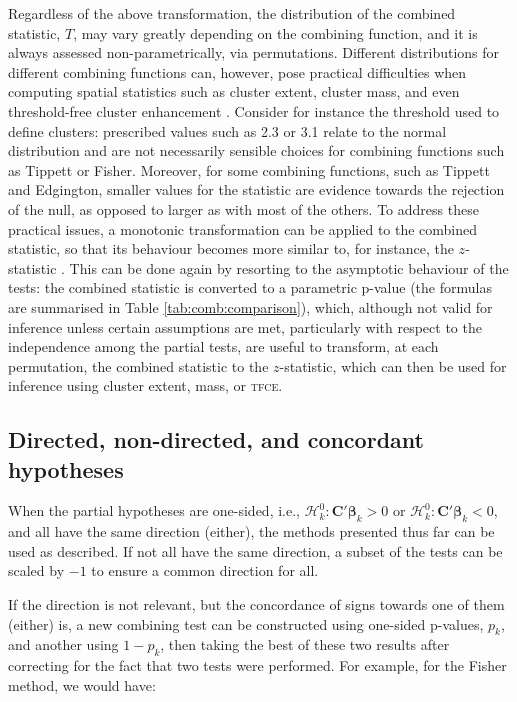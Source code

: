 Regardless of the above transformation, the distribution of the combined statistic, $T$, may vary greatly depending on the combining function, and it is always assessed non-parametrically, via permutations. Different distributions for different combining functions can, however, pose practical difficulties when computing spatial statistics such as cluster extent, cluster mass, and even threshold-free cluster enhancement \citep[\textsc{tfce},][]{Smith2009}. Consider for instance the threshold used to define clusters: prescribed values such as 2.3 or 3.1 \citep{Woo2014} relate to the normal distribution and are not necessarily sensible choices for combining functions such as Tippett or Fisher. Moreover, for some combining functions, such as Tippett and Edgington, smaller values for the statistic are evidence towards the rejection of the null, as opposed to larger as with most of the others. To address these practical issues, a monotonic transformation can be applied to the combined statistic, so that its behaviour becomes more similar to, for instance, the $z$-statistic \citep{Efron2004}. This can be done again by resorting to the asymptotic behaviour of the tests: the combined statistic is converted to a parametric p-value (the formulas are summarised in Table \ref{tab:comb:comparison}), which, although not valid for inference unless certain assumptions are met, particularly with respect to the independence among the partial tests, are useful to transform, at each permutation, the combined statistic to the $z$-statistic, which can then be used for inference using cluster extent, mass, or \textsc{tfce}.

\subsection{Directed, non-directed, and concordant hypotheses}
\label{sec:comb:directed}

When the partial hypotheses are one-sided, i.e., $\mathcal{H}^{0}_{k} : \mathbf{C}'\boldsymbol{\beta}_{k} > 0$ or $\mathcal{H}^{0}_{k} : \mathbf{C}'\boldsymbol{\beta}_{k} < 0$, and all have the same direction (either), the methods presented thus far can be used as described. If not all have the same direction, a subset of the tests can be scaled by $-1$ to ensure a common direction for all.

If the direction is not relevant, but the concordance of signs towards one of them (either) is, a new combining test can be constructed using one-sided p-values, $p_k$, and another using $1-p_k$, then taking the best of these two results after correcting for the fact that two tests were performed. For example, for the Fisher method, we would have:

